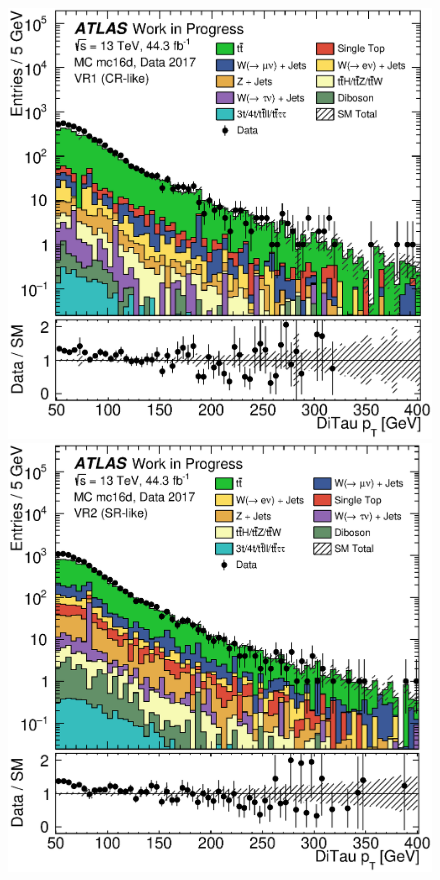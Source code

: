 \clearpage{}
\begin{figure}[th!]
    \centering
    \setlength{\individualPlotWidth}{0.434\fulllinewidth}
    \includegraphics[width=\individualPlotWidth]{Assets/Plots/VR1/h_stack_mc16d_data17_ditau_pt.eps}
    \hspace{1em}
    \includegraphics[width=\individualPlotWidth]{Assets/Plots/VR2/h_stack_mc16d_data17_ditau_pt.eps}

    \label{fig:ch6:VRs_distributions_2}
\end{figure}

\cleardoublepage{}
